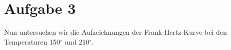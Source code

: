 \section{Aufgabe 3}

Nun untersuchen wir die Aufzeichnungen der Frank-Hertz-Kurve bei den Temperaturen 150\(^\circ\) und 210\(^\circ\).